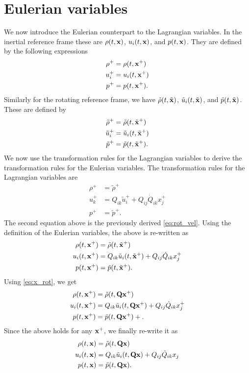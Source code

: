 \documentclass[oneside,a4paper,11pt]{report}
\begin{document}
\section{Eulerian variables}
We now introduce the Eulerian counterpart to the Lagrangian variables. In the inertial reference frame these are $\rho(t,\mathbf{x})$, $u_i(t,\mathbf{x})$, and $p(t,\mathbf{x})$. They are defined by the following expressions
\begin{align}
    \rho^+ &= \rho(t,\mathbf{x}^+) \\
    u_i^+ &= u_i(t,\mathbf{x}^+) \\
    p^+ &= p(t,\mathbf{x}^+).
\end{align}
Similarly for the rotating reference frame, we have $\tilde{\rho}(t,\tilde{\mathbf{x}})$, $\tilde{u}_i(t,\tilde{\mathbf{x}})$, and $\tilde{p}(t,\tilde{\mathbf{x}})$. These are defined by
\begin{align}
    \tilde{\rho}^+ &= \tilde{\rho}(t,\tilde{\mathbf{x}}^+) \\
    \tilde{u}_i^+ &= \tilde{u}_i(t,\tilde{\mathbf{x}}^+) \\
    \tilde{p}^+ &= \tilde{p}(t,\tilde{\mathbf{x}}^+).
\end{align}
We now use the transformation rules for the Lagrangian variables to derive the transformation rules for the Eulerian variables. The transformation rules for the Lagrangian variables are
\begin{align}
    \rho^+ &= \tilde{\rho}^+ \\
    u_k^+ &= Q_{ik} \tilde{u}_i^+ + Q_{ij} \dot{Q}_{ik} x_j^+ \\
    p^+ &= \tilde{p}^+.
\end{align}
The second equation above is the previously derived \cref{eq:rot_vel}. Using the definition of the Eulerian variables, the above is re-written as
\begin{align}
    \rho(t,\mathbf{x}^+) &= \tilde{\rho}(t,\tilde{\mathbf{x}}^+) \label{eq:eul_rho_temp} \\
    u_i(t,\mathbf{x}^+) &= Q_{ik} \tilde{u}_i(t,\tilde{\mathbf{x}}^+)  + Q_{ij} \dot{Q}_{ik} x_j^+ \label{eq:eul_vel_temp}\\
    p(t,\mathbf{x}^+) &= \tilde{p}(t,\tilde{\mathbf{x}}^+). \label{eq:pres_temp}
\end{align}
Using \cref{eq:x_rot}, we get
\begin{align}
    \rho(t,\mathbf{x}^+) &= \tilde{\rho}(t,\mathbf{Q} \mathbf{x}^+) \\
    u_i(t,\mathbf{x}^+) &= Q_{ik} \tilde{u}_i(t,\mathbf{Q} \mathbf{x}^+)  + Q_{ij} \dot{Q}_{ik} x_j^+ \\
    p(t,\mathbf{x}^+) &= \tilde{p}(t,\mathbf{Q} \mathbf{x}^+)+.
\end{align}
Since the above holds for any $\mathbf{x}^+$, we finally re-write it as
\begin{align}
    \rho(t,\mathbf{x}) &= \tilde{\rho}(t,\mathbf{Q} \mathbf{x}) \label{eq:eul_rho_trans}\\
    u_i(t,\mathbf{x}) &= Q_{ik} \tilde{u}_i(t,\mathbf{Q} \mathbf{x})  + Q_{ij} \dot{Q}_{ik} x_j \label{eq:eul_vel_trans}\\
    p(t,\mathbf{x}) &= \tilde{p}(t,\mathbf{Q} \mathbf{x}). \label{eq:eul_pres_trans}
\end{align}
\end{document}
